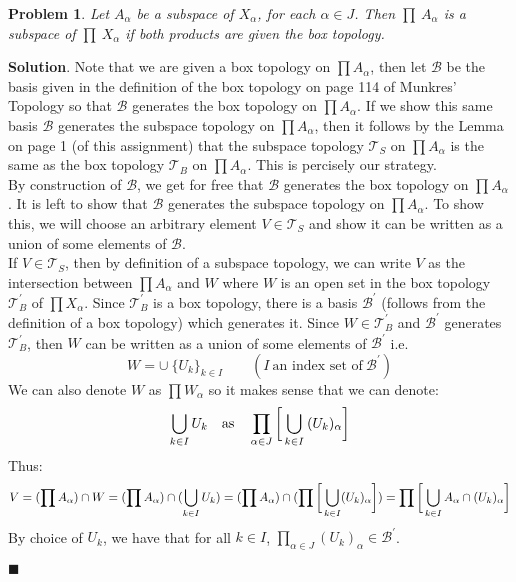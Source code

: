 \documentclass[12pt]{article}
\renewcommand{\=}[1]{\stackrel{#1}{=}} %
\providecommand{\T}{\mathcal{T}}
\newtheorem{p}{Problem}[section]
\theoremstyle{definition}
\newenvironment{s}{%
        \begin{trivlist} \item \textbf{Solution}. }{%
            \hspace*{\fill} $\blacksquare$\end{trivlist}}%
\begin{document}
\newpage

\begin{p}
    Let $A_{\alpha}$ be a subspace of $X_{\alpha}$, for each $\alpha\in J$. Then $\prod\:A_{\alpha}$ is a subspace of $\prod\:X_{\alpha}$ if both
    products are given the box topology.
\end{p}

\begin{s}
    Note that we are given a box topology on $\prod A_{\alpha}$, then let $\mathscr{B}$ be the basis given in the definition of the box topology on page 114 of Munkres'
    Topology so that $\mathscr{B}$ generates the box topology on $\prod A_{\alpha}$.
    If we show this same basis $\mathscr{B}$ generates the subspace topology on $\prod A_{\alpha}$, then it follows by the Lemma on page 1 (of this assignment) that
    the subspace topology $\T_S$ on $\prod A_{\alpha}$ is the same as the box topology $\T_B$ on $\prod A_{\alpha}$. This is percisely our strategy.\\
    By construction of $\mathscr{B}$, we get for free that $\mathscr{B}$ generates the box topology on $\prod A_{\alpha}$.
    It is left to show that $\mathscr{B}$ generates the subspace topology on $\prod A_{\alpha}$. To show this, we will choose an arbitrary element $V\in \T_S$
    and show it can be written as a union of some elements of $\mathscr{B}$.\\
    If $V\in \T_S$, then by definition of a subspace topology, we can write $V$ as the intersection between $\prod A_{\alpha}$ and $W$ where $W$ is an open
    set in the box topology $\T_B^{'}$ of $\prod X_{\alpha}$. Since $\T_B^{'}$ is a box topology, there is a basis $\mathscr{B}^{'}$ (follows from the definition of a
    box topology) which generates it. 
    Since $W\in\T_B^{'}$ and $\mathscr{B}^{'}$ generates $\T_B^{'}$, then $W$ can be written as a union of some elements of $\mathscr{B}^{'}$ i.e.
    \[ W = \cup\: \{U_k\}_{k\in I}\qquad (I\:\text{an index set of}\:\mathscr{B}^{'}) \]
    We can also denote $W$ as $\prod W_{\alpha}$ so it makes sense that we can denote:
    \[ \bigcup_{k\in I} U_k \quad\text{as}\quad \prod_{\alpha\in J} \bigg{[}\bigcup_{k\in I}\:(U_k)_{\alpha}\bigg{]} \]
    Thus:
    \[ V = (\prod A_{\alpha}) \cap W = (\prod A_{\alpha}) \cap (\bigcup_{k\in I} U_k) = (\prod A_{\alpha}) \cap (\prod \bigg{[}\bigcup_{k\in I}(U_k)_{\alpha}\bigg{]}) 
    = \prod \bigg{[}\bigcup_{k\in I} A_{\alpha} \cap (U_k)_{\alpha}\bigg{]}\]
    By choice of $U_k$, we have that for all $k\in I$, $\prod_{\alpha\in J} (U_k)_{\alpha}\in\mathscr{B}^{'}$.

\end{s}
\end{document}
